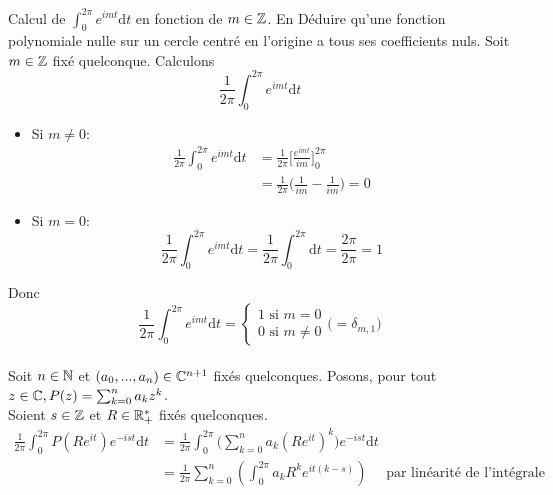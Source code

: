\documentclass{article}
\renewenvironment{question_kholle}[2][ ]
{
	\subsection{\texorpdfstring{#2}{}}
	\notblank{#1}
	{
		\noindent #1
		\bigbreak
	}
	{}
	\begin{proof}
}
{
	\end{proof}
}
\begin{document}
\pagebreak

\begin{question_kholle}{Calcul de $\displaystyle\int_0^{2\pi}e^{imt} \mathrm d t$ en fonction de $m \in \mathbb Z$. En Déduire qu'une fonction polynomiale nulle sur un cercle centré en l'origine a tous ses coefficients nuls.}
  Soit $m \in \mathbb Z$ fixé quelconque. Calculons
  $$\frac{1}{2 \pi} \int_0^{2\pi}e^{imt} \mathrm d t$$
  \begin{itemize}[label=$\star$]
    \item Si $m \neq 0$:
          \begin{align*}
            \frac{1}{2 \pi} \int_0^{2\pi}e^{imt} \mathrm d t & = \frac{1}{2 \pi} \Big[ \frac{e^{imt}}{im} \Big]_0^{2\pi}     \\
                                                             & = \frac{1}{2 \pi} \Big( \frac{1}{im} - \frac{1}{im} \Big) = 0
          \end{align*}
    \item Si $m = 0$:
          $$
            \frac{1}{2 \pi} \int_0^{2\pi}e^{imt} \mathrm d t = \frac{1}{2 \pi} \int_0^{2\pi} \mathrm d t = \frac{2 \pi}{2 \pi} = 1
          $$
  \end{itemize}
  Donc $$\frac{1}{2 \pi} \int_0^{2\pi}e^{imt} \mathrm d t =
    \begin{cases}
      1 \text{ si } m=0 \\
      0 \text{ si } m \neq 0
    \end{cases}
    \bigl(= \delta_{m, 1}\bigr)
  $$
  \\
  Soit $n\in \mathbb N$ et $(a_0, ..., a_n) \in \mathbb C^{n+1}$ fixés quelconques. Posons, pour tout $z\in\mathbb C, P(z) = \sum_{k=0}^n a_k z^k$.\\
  Soient $s\in\mathbb Z$ et $R\in\mathbb R_+^*$ fixés quelconques.
  \begin{align*}
    \frac{1}{2 \pi} \int_0^{2\pi} P(Re^{it}) e^{-ist} \mathrm d t & = \frac{1}{2 \pi} \int_0^{2\pi} \bigg (\sum_{k=0}^n a_k (Re^{it})^k \bigg) e^{-ist} \mathrm d t                                                                                                                                                                                                                                                     \\
                                                                  & = \frac{1}{2\pi}\sum_{k=0}^{n}\left(\int_{0}^{2\pi}a_kR^ke^{it(k-s)}\right)                                                                                                                                                                                                                               \quad\text{ par linéarité de l'intégrale} \\

\end{align*}
\end{question_kholle}
\end{document}
